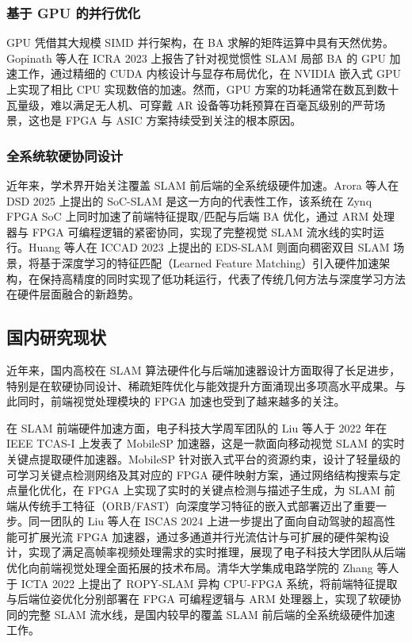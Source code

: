 \subsubsection{基于 GPU 的并行优化}

GPU 凭借其大规模 SIMD 并行架构，在 BA 求解的矩阵运算中具有天然优势。Gopinath 等人\cite{gopinath2023gpu}在 ICRA 2023 上报告了针对视觉惯性 SLAM 局部 BA 的 GPU 加速工作，通过精细的 CUDA 内核设计与显存布局优化，在 NVIDIA 嵌入式 GPU 上实现了相比 CPU 实现数倍的加速。然而，GPU 方案的功耗通常在数瓦到数十瓦量级，难以满足无人机、可穿戴 AR 设备等功耗预算在百毫瓦级别的严苛场景，这也是 FPGA 与 ASIC 方案持续受到关注的根本原因。

\subsubsection{全系统软硬协同设计}

近年来，学术界开始关注覆盖 SLAM 前后端的全系统级硬件加速。Arora 等人\cite{arora2025socslam}在 DSD 2025 上提出的 SoC-SLAM 是这一方向的代表性工作，该系统在 Zynq FPGA SoC 上同时加速了前端特征提取/匹配与后端 BA 优化，通过 ARM 处理器与 FPGA 可编程逻辑的紧密协同，实现了完整视觉 SLAM 流水线的实时运行。Huang 等人\cite{huang2023eds}在 ICCAD 2023 上提出的 EDS-SLAM 则面向稠密双目 SLAM 场景，将基于深度学习的特征匹配（Learned Feature Matching）引入硬件加速架构，在保持高精度的同时实现了低功耗运行，代表了传统几何方法与深度学习方法在硬件层面融合的新趋势。

\subsection{国内研究现状}

近年来，国内高校在 SLAM 算法硬件化与后端加速器设计方面取得了长足进步，特别是在软硬协同设计、稀疏矩阵优化与能效提升方面涌现出多项高水平成果。与此同时，前端视觉处理模块的 FPGA 加速也受到了越来越多的关注。

在 SLAM 前端硬件加速方面，电子科技大学周军团队的 Liu 等人\cite{liu2022mobilesp}于 2022 年在 IEEE TCAS-I 上发表了 MobileSP 加速器，这是一款面向移动视觉 SLAM 的实时关键点提取硬件加速器。MobileSP 针对嵌入式平台的资源约束，设计了轻量级的可学习关键点检测网络及其对应的 FPGA 硬件映射方案，通过网络结构搜索与定点量化优化，在 FPGA 上实现了实时的关键点检测与描述子生成，为 SLAM 前端从传统手工特征（ORB/FAST）向深度学习特征的嵌入式部署迈出了重要一步。同一团队的 Liu 等人\cite{liu2024optflow_fpga}在 ISCAS 2024 上进一步提出了面向自动驾驶的超高性能可扩展光流 FPGA 加速器，通过多通道并行光流估计与可扩展的硬件架构设计，实现了满足高帧率视频处理需求的实时推理，展现了电子科技大学团队从后端优化向前端视觉处理全面拓展的技术布局。清华大学集成电路学院的 Zhang 等人\cite{zhang2022ropyslam}于 ICTA 2022 上提出了 ROPY-SLAM 异构 CPU-FPGA 系统，将前端特征提取与后端位姿优化分别部署在 FPGA 可编程逻辑与 ARM 处理器上，实现了软硬协同的完整 SLAM 流水线，是国内较早的覆盖 SLAM 前后端的全系统级硬件加速工作。

